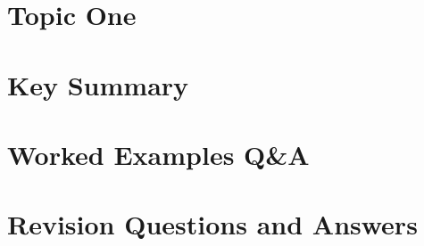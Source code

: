 \documentclass[10pt,a4paper]{article}
\begin{document}
\section{Topic One}

\section{Key Summary}

\section{Worked Examples Q\&A}
%

\section{Revision Questions and Answers}
\end{document}
